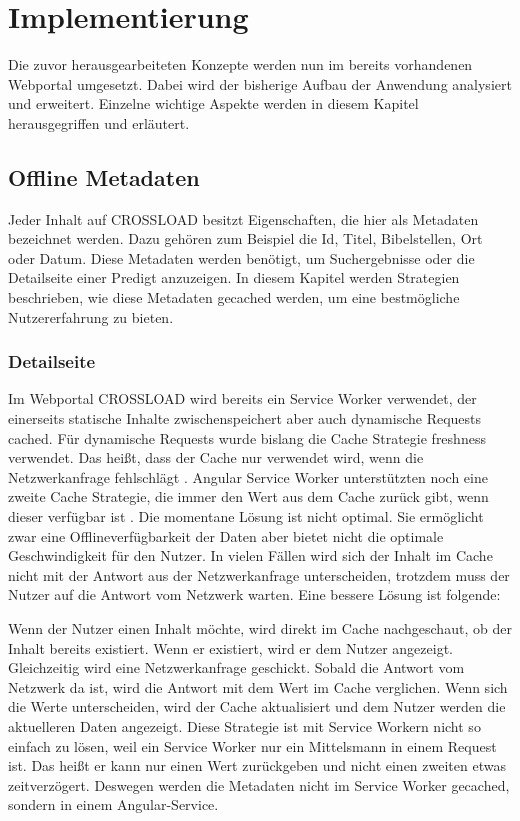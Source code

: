 \chapter{Implementierung}
\label{Kap5}
Die zuvor herausgearbeiteten Konzepte werden nun im bereits vorhandenen Webportal umgesetzt. Dabei wird der bisherige Aufbau der Anwendung analysiert und erweitert. Einzelne wichtige Aspekte werden in diesem Kapitel herausgegriffen und erläutert.

\section{Offline Metadaten}
Jeder Inhalt auf CROSSLOAD besitzt Eigenschaften, die hier als Metadaten bezeichnet werden. Dazu gehören zum Beispiel die Id, Titel, Bibelstellen, Ort oder Datum. Diese Metadaten werden benötigt, um Suchergebnisse oder die Detailseite einer Predigt anzuzeigen. In diesem Kapitel werden Strategien beschrieben, wie diese Metadaten gecached werden, um eine bestmögliche Nutzererfahrung zu bieten.

\subsection{Detailseite}
Im Webportal CROSSLOAD wird bereits ein Service Worker verwendet, der einerseits statische Inhalte zwischenspeichert aber auch dynamische Requests cached. Für dynamische Requests wurde bislang die Cache Strategie freshness verwendet. Das heißt, dass der Cache nur verwendet wird, wenn die Netzwerkanfrage fehlschlägt \autocite{angular-service-worker}. Angular Service Worker unterstützten noch eine zweite Cache Strategie, die immer den Wert aus dem Cache zurück gibt, wenn dieser verfügbar ist \autocite{angular-service-worker}. Die momentane Lösung ist nicht optimal. Sie ermöglicht zwar eine Offlineverfügbarkeit der Daten aber bietet nicht die optimale Geschwindigkeit für den Nutzer. In vielen Fällen wird sich der Inhalt im Cache nicht mit der Antwort aus der Netzwerkanfrage unterscheiden, trotzdem muss der Nutzer auf die Antwort vom Netzwerk warten. Eine bessere Lösung ist folgende:

Wenn der Nutzer einen Inhalt möchte, wird direkt im Cache nachgeschaut, ob der Inhalt bereits existiert. Wenn er existiert, wird er dem Nutzer angezeigt. Gleichzeitig wird eine Netzwerkanfrage geschickt. Sobald die Antwort vom Netzwerk da ist, wird die Antwort mit dem Wert im Cache verglichen. Wenn sich die Werte unterscheiden, wird der Cache aktualisiert und dem Nutzer werden die aktuelleren Daten angezeigt. Diese Strategie ist mit Service Workern nicht so einfach zu lösen, weil ein Service Worker nur ein Mittelsmann in einem Request ist. Das heißt er kann nur einen Wert zurückgeben und nicht einen zweiten etwas zeitverzögert. Deswegen werden die Metadaten nicht im Service Worker gecached, sondern in einem Angular-Service.

